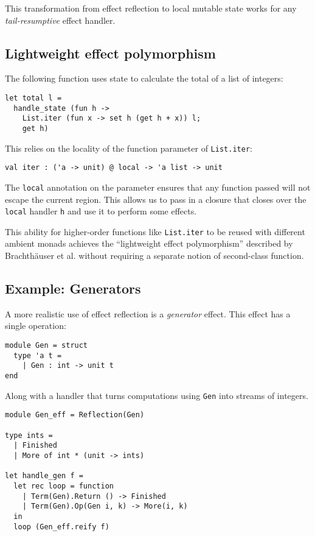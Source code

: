 \documentclass[acmsmall, screen, nonacm]{acmart}
\theoremstyle{definition}
\begin{document}
This transformation from effect reflection to local mutable state works
for any \emph{tail-resumptive} effect handler.

\subsection{Lightweight effect polymorphism}

The following function uses state to calculate the total of a list of
integers:
\begin{lstlisting}[style=oxcaml]
let total l =
  handle_state (fun h ->
    List.iter (fun x -> set h (get h + x)) l;
    get h)
\end{lstlisting}
This relies on the locality of the function parameter of
\lstinline[style=oxcaml]{List.iter}:
\begin{lstlisting}[style=oxcaml]
val iter : ('a -> unit) @ local -> 'a list -> unit
\end{lstlisting}
The \lstinline[style=oxcaml]{local} annotation on the parameter ensures
that any function passed will not escape the current region. This allows
us to pass in a closure that closes over the
\lstinline[style=oxcaml]{local} handler \lstinline[style=oxcaml]{h} and
use it to perform some effects.

This ability for higher-order functions like
\lstinline[style=oxcaml]{List.iter} to be reused with different ambient
monads achieves the ``lightweight effect polymorphism'' described by
Brachth{\"a}user et al.\cite{brachthauser2020effects} without requiring
a separate notion of second-class function.

\subsection{Example: Generators}

A more realistic use of effect reflection is a \emph{generator}
effect. This effect has a single operation:
\begin{lstlisting}[style=oxcaml]
module Gen = struct
  type 'a t =
    | Gen : int -> unit t
end
\end{lstlisting}
Along with a handler that turns computations using
\lstinline[style=oxcaml]{Gen} into streams of integers.
\begin{lstlisting}[style=oxcaml]
module Gen_eff = Reflection(Gen)

type ints =
  | Finished
  | More of int * (unit -> ints)

let handle_gen f =
  let rec loop = function
    | Term(Gen).Return () -> Finished
    | Term(Gen).Op(Gen i, k) -> More(i, k)
  in
  loop (Gen_eff.reify f)
\end{lstlisting}
\end{document}
